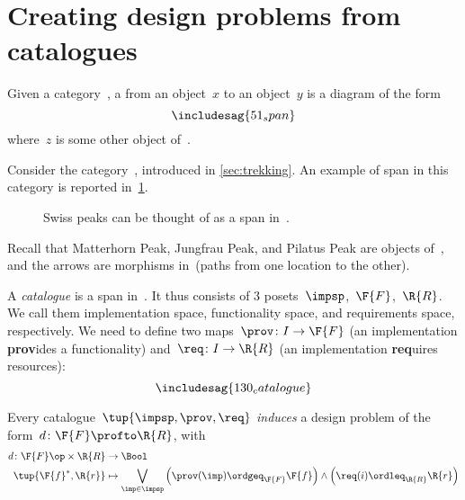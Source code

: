 
\section{Creating design problems from catalogues}
\begin{ctdefinition}[Span]\label{def:span}
  Given a category~\CatC, a \emph{} from an object~$x$ to an object~$y$ is a diagram of the form
  \begin{equation}
    \includesag{51_span}
  \end{equation}
  where~$z$ is some other object of~\CatC.
\end{ctdefinition}

\begin{example}
Consider the category~\Berg, introduced in \cref{sec:trekking}. An example of span in this category is reported in~\cref{fig:exmountains}.
  \begin{figure}[h!]
    \begin{center}
    \end{center}
    \caption{Swiss peaks can be thought of as a span in~\Trek. \label{fig:exmountains}}
  \end{figure}
  Recall that \textsf{Matterhorn Peak}, \textsf{Jungfrau Peak}, and \textsf{Pilatus Peak} are objects of~\Trek, and the arrows are morphisms in~\Trek (paths from one location to the other).
\end{example}

\begin{definition}[Catalogue]
  \label{def:catalogue}
  A \emph{catalogue} is a span in~\Pos.
  It thus consists of 3 posets~$\impsp$,~$\F{F}$,~$\R{R}$.
  We call them implementation space, functionality space, and requirements space, respectively. We need to define two maps~$\prov \colon I \to \F{F}$ (an implementation \textbf{prov}ides a functionality) and~$\req\colon I \to \R{R}$ (an implementation \textbf{req}uires resources):
  \begin{equation}
    \includesag{130_catalogue}
  \end{equation}
\end{definition}

\begin{definition}
  Every catalogue~$\tup{\impsp,\prov,\req}$ \emph{induces} a design problem of the form~$d\colon \F{F}\profto \R{R}$, with
  \begin{equation}
    \begin{aligned}
      d\colon \F{F}\op \times \R{R}&\to \Bool\\
      \tup{\F{f}^*,\R{r}}&\mapsto \bigvee_{\imp\in \impsp}\left(\prov(\imp)\ordgeq_{\F{F}}\F{f} \right)\wedge \left( \req(i)\ordleq_{\R{R}}\R{r}\right)
    \end{aligned}
  \end{equation}
\end{definition}

